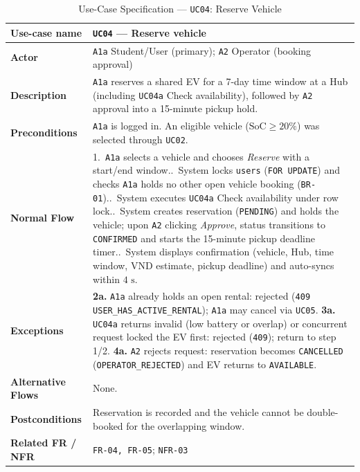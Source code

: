 \begin{table}[H]
  \centering
  \singlespacing\footnotesize
  \caption{Use-Case Specification --- \texttt{UC04}: Reserve Vehicle}
  \label{tab:uc04}
  \renewcommand{\arraystretch}{1.13}
  \begin{tabularx}{\textwidth}{|L{2.9cm}|Y|}
    \hline
    \textbf{Use-case name} & \textbf{\texttt{UC04} --- Reserve vehicle} \\
    \hline
    \textbf{Actor} & \texttt{A1a} Student/User (primary); \texttt{A2} Operator (booking approval) \\
    \hline
    \textbf{Description} & \texttt{A1a} reserves a shared EV for a 7-day time window at a Hub (including \texttt{UC04a} Check availability), followed by \texttt{A2} approval into a 15-minute pickup hold. \\
    \hline
    \textbf{Preconditions} & \texttt{A1a} is logged in. An eligible vehicle ($\text{SoC} \ge 20\%$) was selected through \texttt{UC02}. \\
    \hline
    \textbf{Normal Flow} & 1.\ \texttt{A1a} selects a vehicle and chooses \textit{Reserve} with a start/end window..\ System locks \texttt{users} (\texttt{FOR UPDATE}) and checks \texttt{A1a} holds no other open vehicle booking (\texttt{BR-01})..\ System executes \texttt{UC04a} Check availability under row lock..\ System creates reservation (\texttt{PENDING}) and holds the vehicle; upon \texttt{A2} clicking \textit{Approve}, status transitions to \texttt{CONFIRMED} and starts the 15-minute pickup deadline timer..\ System displays confirmation (vehicle, Hub, time window, VND estimate, pickup deadline) and auto-syncs within $4\text{ s}$. \\
    \hline
    \textbf{Exceptions} & \textbf{2a.} \texttt{A1a} already holds an open rental: rejected (\texttt{409 USER\_\allowbreak HAS\_\allowbreak ACTIVE\_\allowbreak RENTAL}); \texttt{A1a} may cancel via \texttt{UC05}.\newline
    \textbf{3a.} \texttt{UC04a} returns invalid (low battery or overlap) or concurrent request locked the EV first: rejected (\texttt{409}); return to step 1/2.\newline
    \textbf{4a.} \texttt{A2} rejects request: reservation becomes \texttt{CANCELLED} (\texttt{OPERATOR\_\allowbreak REJECTED}) and EV returns to \texttt{AVAILABLE}. \\
    \hline
    \textbf{Alternative Flows} & None. \\
    \hline
    \textbf{Postconditions} & Reservation is recorded and the vehicle cannot be double-booked for the overlapping window. \\
    \hline
    \textbf{Related FR / NFR} & \texttt{FR-04, FR-05}; \texttt{NFR-03} \\
    \hline
  \end{tabularx}
\end{table}

